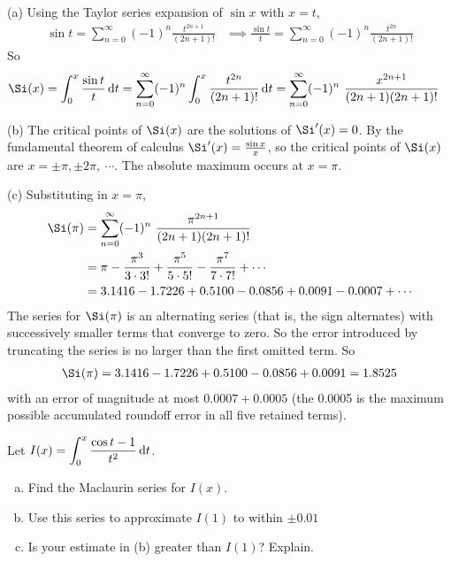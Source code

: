 \begin{solution} (a)
Using the Taylor series expansion of $\sin x$ with $x=t$,
\begin{align*}
\sin t =\sum_{n=0}^\infty (-1)^n\frac{t^{2n+1}}{(2n+1)!}
&\implies \frac{\sin t}{t} =\sum_{n=0}^\infty (-1)^n\frac{t^{2n}}{(2n+1)!}
\end{align*}
So
\begin{align*}
\Si(x)
&=\int_0^x\frac{\sin t}{t}\,\dee{t}
=\sum_{n=0}^\infty (-1)^n\int_0^x \frac{t^{2n}}{(2n+1)!}\,\dee{t}
=\sum_{n=0}^\infty (-1)^n\ \frac{x^{2n+1}}{(2n+1)(2n+1)!}
\end{align*}

\noindent (b)
The critical points of $\Si(x)$ are the solutions of $\Si'(x)=0$.
By the fundamental theorem of calculus $\Si'(x)=\frac{\sin x}{x}$,
so the critical points of $\Si(x)$ are $x=\pm \pi, \pm 2\pi,\ \cdots$.
The absolute maximum occurs at $x=\pi$.

\noindent (c)
Substituting in $x=\pi$,
\begin{align*}
\Si(\pi)&=\sum_{n=0}^\infty (-1)^n\ \frac{\pi^{2n+1}}{(2n+1)(2n+1)!}\\
&=\pi-\frac{\pi^3}{3\cdot 3!}+\frac{\pi^5}{5\cdot 5!}-\frac{\pi^7}{7\cdot 7!}+\cdots\\
&=3.1416-1.7226+0.5100-0.0856+0.0091-0.0007+\cdots
\end{align*}
The series for $\Si(\pi)$ is an alternating series (that is, the sign alternates)
with successively smaller terms that converge to zero.
So the error introduced by truncating the series is no larger than the first omitted term. So
\begin{align*}
\Si(\pi)=3.1416-1.7226+0.5100-0.0856+0.0091=1.8525
\end{align*}
with an error of magnitude at most $0.0007+0.0005$ (the 0.0005 is the maximum
possible accumulated roundoff error in all five retained terms).

\end{solution}


\begin{Mquestion}[1997D]
  Let $\displaystyle I(x)=\int_0^x\frac{\cos t-1}{t^2}\,\mathrm{d}t$.

\begin{enumerate}[(a)]
\item
Find the Maclaurin series for $I(x)$.
\item
Use this series to approximate $I(1)$ to within $\pm0.01$
\item
  Is your estimate in (b) greater than $I(1)$? Explain.
\end{enumerate}
\end{Mquestion}

